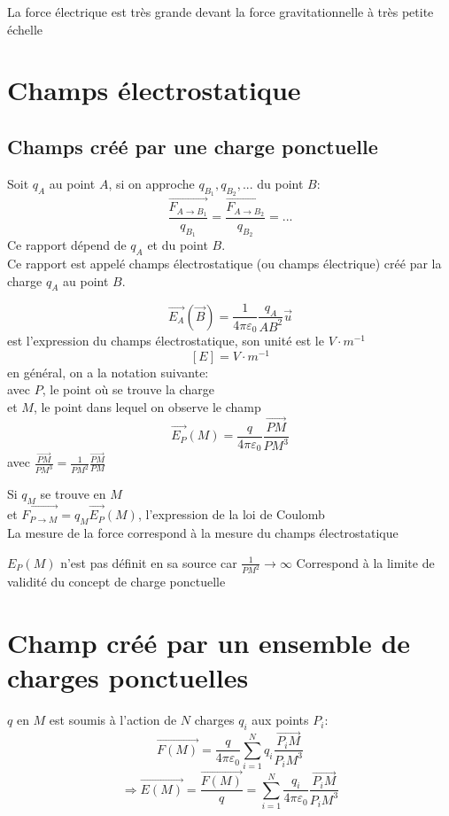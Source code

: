 \documentclass[../main.tex]{subfile}
\begin{document}
La force électrique est très grande devant la force gravitationnelle à très petite échelle

\section{Champs électrostatique}
\subsection{Champs créé par une charge ponctuelle}
Soit $q_A$ au point $A$, si on approche $q_{B_1}, q_{B_2}, ...$ du point $B$:
$$\frac{\vec{F_{A \to B_1}}}{q_{B_1}} = \frac{\vec{F_{A \to B_2}}}{q_{B_2}} = ...$$
Ce rapport dépend de $q_A$ et du point $B$.\\
Ce rapport est appelé champs électrostatique (ou champs électrique) créé par la charge $q_A$ au point $B$.

$$\vec{E_A}(\vec{B}) = \frac{1}{4 \pi \varepsilon_0} \frac{q_A}{AB^2} \vec{u}$$
est l'expression du champs électrostatique, son unité est le $V \cdot m^{-1}$
$$[E] = V \cdot m^{-1}$$
en général, on a la notation suivante:\\
avec $P$, le point où se trouve la charge\\
et $M$, le point dans lequel on observe le champ
$$\vec{E_P}(M) = \frac{q}{4\pi \varepsilon_0} \frac{\vec{PM}}{PM^3}$$
avec $\frac{\vec{PM}}{PM^3} = \frac{1}{PM^2} \frac{\vec{PM}}{PM}$\\

\begin{rema}
	Si $q_M$ se trouve en $M$\\
	et $\vec{F_{P \to M}} = q_M \vec{E_P}(M)$, l'expression de la loi de Coulomb\\
	La mesure de la force correspond à la mesure du champs électrostatique
\end{rema}

\begin{rema}
	$E_P(M)$ n'est pas définit en sa source car $\frac{1}{PM^2} \to \infty$
	Correspond à la limite de validité du concept de charge ponctuelle
\end{rema}


\section{Champ créé par un ensemble de charges ponctuelles}

$q$ en $M$ est soumis à l'action de $N$ charges $q_i$ aux points $P_i$:
$$\vec{F(M)} = \frac{q}{4\pi\varepsilon_0} \sum\limits_{i=1}^N q_i \frac{\vec{P_iM}}{P_iM^3}$$
$$\Rightarrow \vec{E(M)} = \frac{\vec{F(M)}}{q} = \sum\limits_{i=1}^N \frac{q_i}{4\pi\varepsilon_0} \frac{\vec{P_iM}}{P_iM^3}$$
\end{document}
